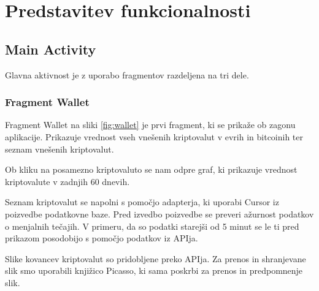 \documentclass[11pt,a4paper]{article}
\begin{document}
\section{Predstavitev funkcionalnosti}


\subsection{Main Activity}
Glavna aktivnost je z uporabo fragmentov razdeljena na tri dele.

\subsubsection{Fragment Wallet}
Fragment Wallet na sliki \ref{fig:wallet} je prvi fragment, ki se prikaže ob zagonu aplikacije. Prikazuje vrednost vseh vnešenih kriptovalut v evrih in bitcoinih ter
seznam vnešenih kriptovalut. 

Ob kliku na posamezno kriptovaluto se nam
odpre graf, ki prikazuje vrednost kriptovalute v zadnjih 60 dnevih.

Seznam kriptovalut se napolni s pomočjo adapterja, ki uporabi Cursor iz
poizvedbe podatkovne baze. Pred izvedbo poizvedbe se preveri ažurnost
podatkov o menjalnih tečajih. V primeru, da so podatki starejši od 5 minut
se le ti pred prikazom posodobijo s pomočjo podatkov iz APIja.

Slike kovancev kriptovalut so pridobljene preko APIja. Za prenos in 
shranjevane slik smo uporabili knjižico Picasso, ki sama poskrbi za
prenos in predpomnenje slik\cite{picasso}.
\end{document}
